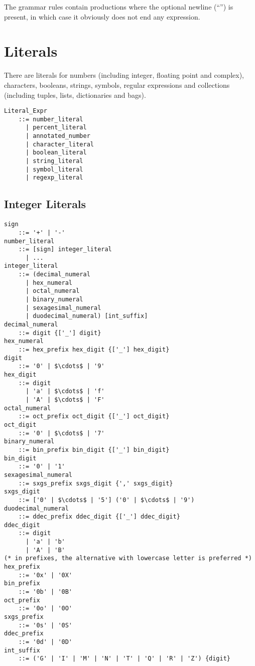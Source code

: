 The grammar rules contain productions where the optional newline (``\code{[nl]}'') is present, in which case it obviously does not end any expression. 






\section{Literals}
\label{sec:literals}

There are literals for numbers (including integer, floating point and complex), characters, booleans, strings, symbols, regular expressions and collections (including tuples, lists, dictionaries and bags). 

\syntax\begin{lstlisting}
Literal_Expr
    ::= number_literal
      | percent_literal
      | annotated_number
      | character_literal
      | boolean_literal
      | string_literal
      | symbol_literal
      | regexp_literal
\end{lstlisting}






\subsection{Integer Literals}
\label{sec:integerliterals}

\syntax\begin{lstlisting}
sign 
    ::= '+' | '-'
number_literal
    ::= [sign] integer_literal
      | ...
integer_literal 
    ::= (decimal_numeral
      | hex_numeral
      | octal_numeral
      | binary_numeral
      | sexagesimal_numeral
      | duodecimal_numeral) [int_suffix]
decimal_numeral
    ::= digit {['_'] digit}
hex_numeral
    ::= hex_prefix hex_digit {['_'] hex_digit}
digit 
    ::= '0' | $\cdots$ | '9'
hex_digit
    ::= digit 
      | 'a' | $\cdots$ | 'f' 
      | 'A' | $\cdots$ | 'F'
octal_numeral 
    ::= oct_prefix oct_digit {['_'] oct_digit}
oct_digit
    ::= '0' | $\cdots$ | '7'
binary_numeral 
    ::= bin_prefix bin_digit {['_'] bin_digit}
bin_digit
    ::= '0' | '1'
sexagesimal_numeral
    ::= sxgs_prefix sxgs_digit {',' sxgs_digit}
sxgs_digit
    ::= ['0' | $\cdots$ | '5'] ('0' | $\cdots$ | '9')
duodecimal_numeral
    ::= ddec_prefix ddec_digit {['_'] ddec_digit}
ddec_digit
    ::= digit 
      | 'a' | 'b'
      | 'A' | 'B'
(* in prefixes, the alternative with lowercase letter is preferred *)
hex_prefix
    ::= '0x' | '0X' 
bin_prefix
    ::= '0b' | '0B'
oct_prefix
    ::= '0o' | '0O'
sxgs_prefix
    ::= '0s' | '0S'
ddec_prefix
    ::= '0d' | '0D'
int_suffix
    ::= ('G' | 'I' | 'M' | 'N' | 'T' | 'Q' | 'R' | 'Z') {digit}
\end{lstlisting}

